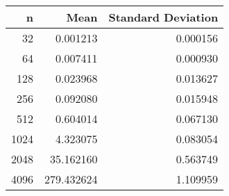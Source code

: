 \begin{tabular}{rrr}
\toprule
    n &        Mean &  Standard Deviation \\
\midrule
   32 &    0.001213 &            0.000156 \\
   64 &    0.007411 &            0.000930 \\
  128 &    0.023968 &            0.013627 \\
  256 &    0.092080 &            0.015948 \\
  512 &    0.604014 &            0.067130 \\
 1024 &    4.323075 &            0.083054 \\
 2048 &   35.162160 &            0.563749 \\
 4096 &  279.432624 &            1.109959 \\
\bottomrule
\end{tabular}
